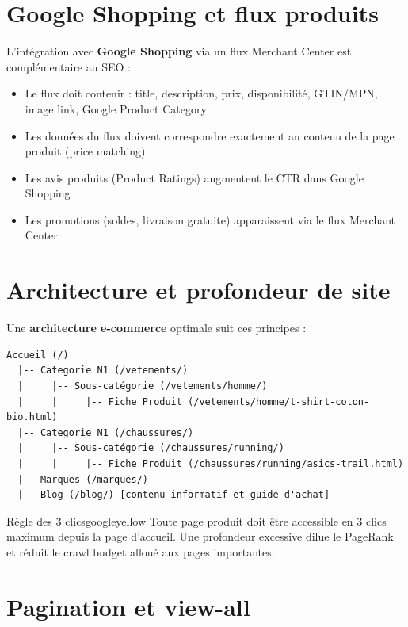 \documentclass[12pt,a4paper,twoside]{report}
\newcommand{\keyword}[1]{\textbf{\textcolor{googleblue}{#1}}}
\begin{document}
\section{Google Shopping et flux produits}

L'intégration avec \keyword{Google Shopping} via un flux Merchant Center est complémentaire au SEO :

\begin{itemize}
    \item Le flux doit contenir : title, description, prix, disponibilité, GTIN/MPN, image link, Google Product Category
    \item Les données du flux doivent correspondre exactement au contenu de la page produit (price matching)
    \item Les avis produits (Product Ratings) augmentent le CTR dans Google Shopping
    \item Les promotions (soldes, livraison gratuite) apparaissent via le flux Merchant Center
\end{itemize}

\section{Architecture et profondeur de site}

Une \keyword{architecture e-commerce} optimale suit ces principes :

\begin{lstlisting}[style=htmlcode,caption={Architecture e-commerce à profondeur limitée (3 clics max)}]
Accueil (/)
  |-- Categorie N1 (/vetements/)
  |     |-- Sous-catégorie (/vetements/homme/)
  |     |     |-- Fiche Produit (/vetements/homme/t-shirt-coton-bio.html)
  |-- Categorie N1 (/chaussures/)
  |     |-- Sous-catégorie (/chaussures/running/)
  |     |     |-- Fiche Produit (/chaussures/running/asics-trail.html)
  |-- Marques (/marques/)
  |-- Blog (/blog/) [contenu informatif et guide d'achat]
\end{lstlisting}

\begin{mybox}{Règle des 3 clics}{googleyellow}
Toute page produit doit être accessible en 3 clics maximum depuis la page d'accueil. Une profondeur excessive dilue le PageRank et réduit le crawl budget alloué aux pages importantes.
\end{mybox}

\section{Pagination et view-all}
\end{document}
